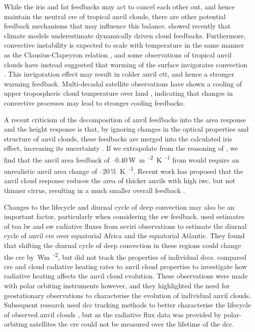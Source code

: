 While the iris and \acrshort{fat} feedbacks may act to cancel each other out, and hence maintain the neutral \acrshort{cre} of tropical anvil clouds, there are other potential feedback mechanisms that may influence this balance.
\citet{hill_climate_2023} showed recently that climate models underestimate dynamically driven cloud feedbacks.
Furthermore, convective instability is expected to scale with temperature in the same manner as the Clausius-Clapeyron relation \citep{seeley_why_2015, agard_clausius_2017}, and some observations of tropical anvil clouds have instead suggested that warming of the surface invigorates convection \citep{igel_cloudsat_2014}.
This invigoration effect may result in colder anvil \acrfull{ctt}, and hence a stronger warming feedback.
Multi-decadal satellite observations have shown a cooling of upper tropospheric cloud temperature over land \citep{liu_observed_2023}, indicating that changes in convective processes may lead to stronger cooling feedbacks.

A recent criticism of the \citet{sherwood_assessment_2020} decomposition of anvil feedbacks into the area response and the height response is that, by ignoring changes in the optical properties and structure of anvil clouds, these feedbacks are merged into the calculated iris effect, increasing its uncertainty \citep{raghuraman_observational_2024}.
If we extrapolate from the reasoning of \citet{mckim_weak_2024}, we find that the anvil area feedback of --0.40\,\unit{W m\textsuperscript{-2} K\textsuperscript{-1}} from \citet{sherwood_assessment_2020} would require an unrealistic anvil area change of --20\,\unit{\% K\textsuperscript{-1}}.
Recent work has proposed that the anvil cloud response reduces the area of thicker anvils with high \acrshort{iwc}, but not thinner cirrus, resulting in a much smaller overall feedback \citep{mckim_weak_2024, sokol_greater_2024}.

Changes to the lifecycle and diurnal cycle of deep convection may also be an important factor, particularly when considering the \acrshort{sw} feedback. 
\citet{nowicki_observations_2004} used estimates of \acrfull{toa} \acrshort{lw} and \acrshort{sw} radiative fluxes from \acrfull{seviri} observations to estimate the diurnal cycle of anvil \acrshort{cre} over equatorial Africa and the equatorial Atlantic. 
They found that shifting the diurnal cycle of deep convection in these regions could change the \acrshort{cre} by \,\unit{Wm\textsuperscript{-2}}, but did not track the properties of individual \acrshort{dcc}s.
\citet{bouniol_macrophysical_2016} compared \acrshort{cre} and cloud radiative heating rates to anvil cloud properties to investigate how radiative heating affects the anvil cloud evolution.
These observations were made with polar orbiting instruments however, and they highlighted the need for geostationary observations to characterise the evolution of individual anvil clouds.
Subsequent research used \acrshort{dcc} tracking methods to better characterise the lifecycle of observed anvil clouds \citep{bouniol_life_2021}, but as the radiative flux data was provided by polar-orbiting satellites the \acrshort{cre} could not be measured over the lifetime of the \acrshort{dcc}.


